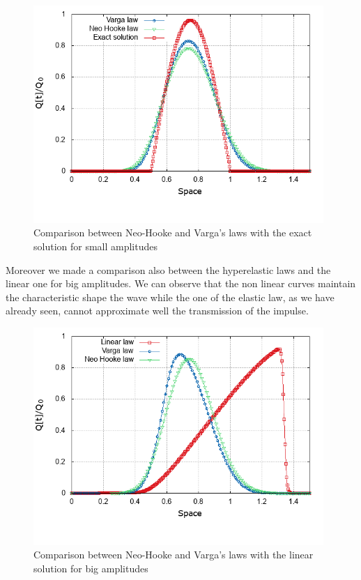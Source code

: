 \documentclass[12pt,a4paper]{article}
\numberwithin{equation}{section}
\begin{document}
\begin{figure}[H]
  \centering
    \includegraphics[width=11cm]{exact_hyper_small_amplit.png}
    \caption{Comparison between Neo-Hooke and Varga's laws with the exact solution for small amplitudes}
    \label{fig:V}
\end{figure}
\noindent
Moreover we made a comparison also between the hyperelastic laws and the linear one for big amplitudes. We can observe that the non linear curves maintain the characteristic shape the wave while the one of the elastic law, as we have already seen, cannot approximate well the transmission of the impulse.
\begin{figure}[H]
  \centering
    \includegraphics[width=11cm]{Varga_NH_ampli1.png}
    \caption{Comparison between Neo-Hooke and Varga's laws with the linear solution for big amplitudes}
    \label{fig:V}
\end{figure}
\newpage
\end{document}
